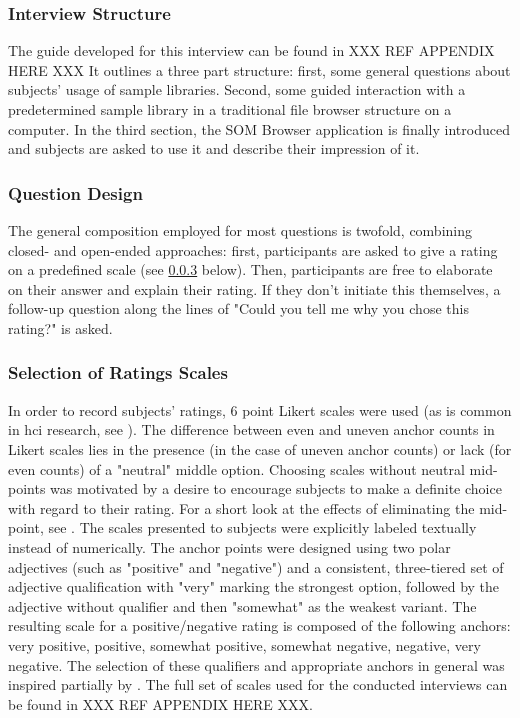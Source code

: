 \subsubsection{Interview Structure}
\label{subsubsec:interview_structure}
The guide developed for this interview can be found in
XXX REF APPENDIX HERE XXX
It outlines a three part structure: first, some general questions about
subjects' usage of sample libraries. Second, some guided interaction with a
predetermined sample library in a traditional file browser structure on a
computer. In the third section, the SOM Browser application is finally
introduced and subjects are asked to use it and describe their impression of it.

\subsubsection{Question Design}
\label{subsubsec:question_design}
The general composition employed for most questions is twofold, combining
closed- and open-ended approaches: first,
participants are asked to give a rating on a predefined scale (see
\ref{subsubsec:ratings_scales} below).
Then, participants are free to elaborate on their answer and explain their
rating. If they don't initiate this themselves, a follow-up question along the
lines of "Could you tell me why you chose this rating?" is asked.

\subsubsection{Selection of Ratings Scales}
\label{subsubsec:ratings_scales}
In order to record subjects' ratings, 6 point Likert scales were used (as is
common in \gls{hci} research, see \citet[p.31, p.93]{lazar2017}). The difference
between even and uneven anchor counts in Likert scales lies in the presence (in
the case of uneven anchor counts) or lack (for even counts) of a "neutral"
middle option. Choosing scales without neutral mid-points was motivated by a
desire to encourage subjects to make a definite choice with regard to their
rating. For a short look at the effects of eliminating the mid-point, see
\citet{garland1991}.
\smallskip
The scales presented to subjects were explicitly labeled textually instead of
numerically. The anchor points were designed using two polar adjectives (such as
"positive" and "negative") and a consistent, three-tiered set of adjective
qualification with "very" marking the strongest option, followed by the
adjective without qualifier and then "somewhat" as the weakest variant. The
resulting scale for a positive/negative rating is composed of the following
anchors: very positive, positive, somewhat positive, somewhat negative,
negative, very negative. The selection of these qualifiers and appropriate
anchors in general was inspired partially by \citet{vagias2006}. The full set of
scales used for the conducted interviews can be found in
XXX REF APPENDIX HERE XXX.

